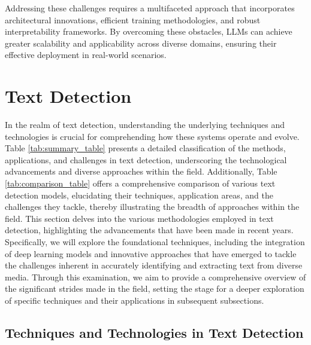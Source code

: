 Addressing these challenges requires a multifaceted approach that incorporates architectural innovations, efficient training methodologies, and robust interpretability frameworks. By overcoming these obstacles, LLMs can achieve greater scalability and applicability across diverse domains, ensuring their effective deployment in real-world scenarios.









\section{Text Detection} \label{sec:Text Detection}



In the realm of text detection, understanding the underlying techniques and technologies is crucial for comprehending how these systems operate and evolve. Table \ref{tab:summary_table} presents a detailed classification of the methods, applications, and challenges in text detection, underscoring the technological advancements and diverse approaches within the field. Additionally, Table \ref{tab:comparison_table} offers a comprehensive comparison of various text detection models, elucidating their techniques, application areas, and the challenges they tackle, thereby illustrating the breadth of approaches within the field. This section delves into the various methodologies employed in text detection, highlighting the advancements that have been made in recent years. Specifically, we will explore the foundational techniques, including the integration of deep learning models and innovative approaches that have emerged to tackle the challenges inherent in accurately identifying and extracting text from diverse media. Through this examination, we aim to provide a comprehensive overview of the significant strides made in the field, setting the stage for a deeper exploration of specific techniques and their applications in subsequent subsections.









\subsection{Techniques and Technologies in Text Detection} \label{subsec:Techniques and Technologies in Text Detection}

